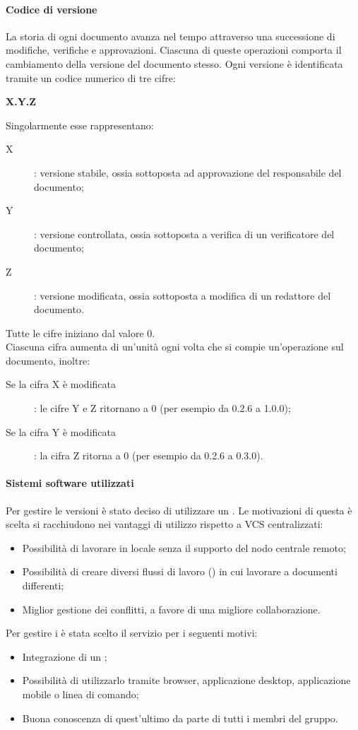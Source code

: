 \paragraph{Codice di versione}
La storia di ogni documento avanza nel tempo attraverso una successione di modifiche, verifiche e approvazioni. Ciascuna di queste operazioni comporta il cambiamento della versione del documento stesso. Ogni versione è identificata tramite un codice numerico di tre cifre:
\begin{center}
\textbf{X.Y.Z} 
\end{center}
Singolarmente esse rappresentano:
\begin{description}
  	\item[X] : versione stabile, ossia sottoposta ad approvazione del responsabile del documento;
  	\item[Y] : versione controllata, ossia sottoposta a verifica di un verificatore del documento;
  	\item[Z] : versione modificata, ossia sottoposta a modifica di un redattore del documento.
\end{description}
Tutte le cifre iniziano dal valore 0. \\ 
Ciascuna cifra aumenta di un'unità ogni volta che si compie un'operazione sul documento, inoltre:
\begin{description}
	\item[Se la cifra X è modificata] : le cifre Y e Z ritornano a 0 (per esempio da 0.2.6 a 1.0.0);
	\item[Se la cifra Y è modificata] : la cifra Z ritorna a 0 (per esempio da 0.2.6 a 0.3.0).
\end{description}

\paragraph{Sistemi software utilizzati}
Per gestire le versioni è stato deciso di utilizzare un  . 
Le motivazioni di questa è scelta si racchiudono nei vantaggi di utilizzo rispetto a VCS centralizzati:
\begin{itemize}
	\item Possibilità di lavorare in locale senza il supporto del nodo centrale remoto; 
	\item Possibilità di creare diversi flussi di lavoro () in cui lavorare a documenti differenti;
	\item Miglior gestione dei conflitti, a favore di una migliore collaborazione.
\end{itemize}
Per gestire i   è stata scelto il servizio  per i seguenti motivi: 
\begin{itemize}
	\item Integrazione di un ;
	\item Possibilità di utilizzarlo tramite browser, applicazione desktop, applicazione mobile o linea di comando;
	\item Buona conoscenza di quest'ultimo da parte di tutti i membri del gruppo.
\end{itemize}


